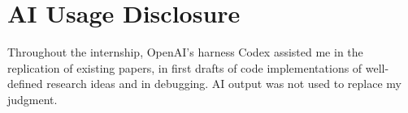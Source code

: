 \section*{AI Usage Disclosure}

Throughout the internship, OpenAI's harness Codex assisted me in the replication of existing papers, in first drafts of code implementations of well-defined research ideas and in debugging. AI output was not used to replace my judgment.
